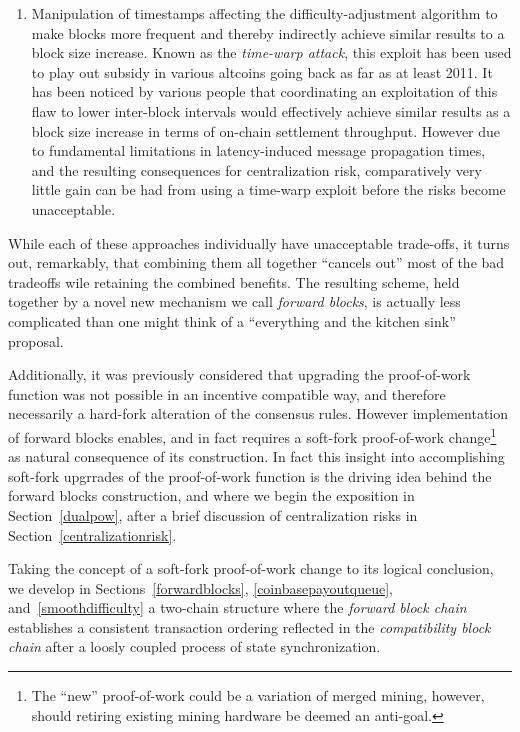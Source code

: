 \begin{enumerate}
  \item
    Manipulation of timestamps affecting the difficulty-adjustment
    algorithm to make blocks more frequent and thereby indirectly
    achieve similar results to a block size increase.  Known as the
    \emph{time-warp attack}, this exploit has been used to play out
    subsidy in various altcoins going back as far as at least 2011.
    It has been noticed by various people that coordinating an
    exploitation of this flaw to lower inter-block intervals would
    effectively achieve similar results as a block size increase in
    terms of on-chain settlement throughput.  However due to
    fundamental limitations in latency-induced message propagation
    times, and the resulting consequences for centralization risk,
    comparatively very little gain can be had from using a time-warp
    exploit before the risks become unacceptable.
\end{enumerate}

While each of these approaches individually have unacceptable
trade-offs, it turns out, remarkably, that combining them all together
``cancels out'' most of the bad tradeoffs wile retaining the combined
benefits.  The resulting scheme, held together by a novel new
mechanism we call \emph{forward blocks}, is actually less complicated
than one might think of a ``everything and the kitchen sink''
proposal.

Additionally, it was previously considered that upgrading the
proof-of-work function was not possible in an incentive compatible
way, and therefore necessarily a hard-fork alteration of the consensus
rules.  However implementation of forward blocks enables, and in fact
requires a soft-fork proof-of-work change\footnote{The ``new''
  proof-of-work could be a variation of merged mining, however, should
  retiring existing mining hardware be deemed an anti-goal.} as
natural consequence of its construction.  In fact this insight into
accomplishing soft-fork upgrrades of the proof-of-work function is the
driving idea behind the forward blocks construction, and where we
begin the exposition in Section~\ref{dualpow}, after a brief
discussion of centralization risks in
Section~\ref{centralizationrisk}.

Taking the concept of a soft-fork proof-of-work change to its logical
conclusion, we develop in Sections~\ref{forwardblocks},
\ref{coinbasepayoutqueue}, and~\ref{smoothdifficulty} a two-chain
structure where the \emph{forward block chain} establishes a
consistent transaction ordering reflected in the \emph{compatibility
  block chain} after a loosly coupled process of state
synchronization.

